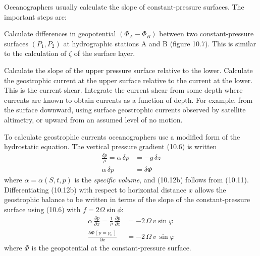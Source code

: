 Oceanographers usually calculate the slope of constant-pressure surfaces.
The important steps are:
\begin{enumerate}
\vitem Calculate differences in geopotential $\left( \Phi_A - \Phi_B \right)$
between two constant-pressure surfaces $\left( P_1 , P_2 \right)$ at hydrographic
stations A and B (figure 10.7). This is similar
to the calculation of $\zeta$ of the surface layer.

\vitem Calculate the slope of the upper pressure surface relative to the
lower.
\vitem Calculate the geostrophic current at the upper surface relative to the
current at the lower. This is the current shear.
\vitem Integrate the current shear from some depth where currents are known to
obtain currents as a function of depth. For example, from the surface downward,
using surface geostrophic currents observed by satellite altimetry, or upward
from an assumed level of no motion.
\end{enumerate}
To calculate geostrophic currents oceanographers use a modified form of the
hydrostatic equation. The vertical pressure gradient (10.6) is written
\begin{subequations}
\begin{align}
\frac{\delta p}{\rho}=\alpha\,\delta p &=-g\,\delta z \\
\alpha\,\delta p&=\delta\Phi
\end{align}
\end{subequations}
where $\alpha = \alpha(S,t,p)$ is the \textit{specific volume}, and (10.12b) follows from (10.11). Differentiating (10.12b) with
respect to horizontal distance $x$ allows the geo\-stro\-phic balance to be written
in terms of the slope of the constant-pressure surface using (10.6) with $f = 2 \Omega \sin \phi $:
\begin{subequations}
\begin{align}
\alpha\,\frac{\partial p}{\partial x} =\frac{1}{\rho}\,\frac{\partial
p}{\partial x} &=-2\,\Omega \,v\sin \varphi \\
\frac{\partial \Phi \left( p=p_0 \right)} {\partial x}
 &= - 2 \, \Omega \,v \, \sin{\varphi}
\end{align}
\end{subequations}
where $\Phi$ is the geopotential at the constant-pressure surface.

